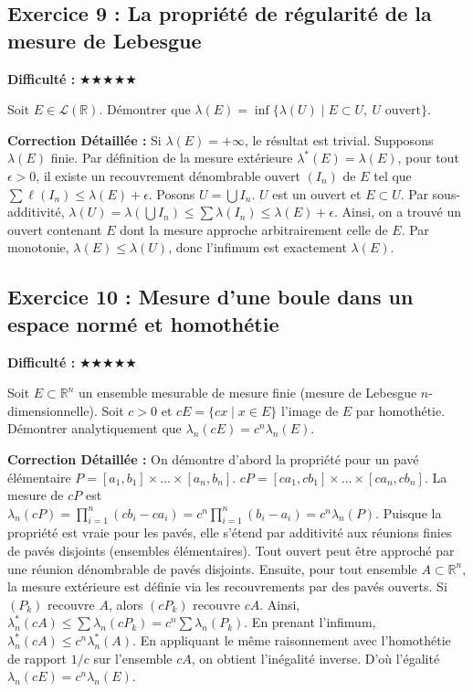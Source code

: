 \documentclass[11pt,a4paper]{article}
\begin{document}
\newpage
\subsection*{Exercice 9 : La propriété de régularité de la mesure de Lebesgue}

\textbf{Difficulté :} $\bigstar\bigstar\bigstar\bigstar\bigstar$

Soit $E \in \mathcal{L}(\mathbb{R})$. Démontrer que $\lambda(E) = \inf\{\lambda(U) \mid E \subset U, \ U \text{ ouvert}\}$.

\textbf{Correction Détaillée :}
Si $\lambda(E) = +\infty$, le résultat est trivial. Supposons $\lambda(E)$ finie.
Par définition de la mesure extérieure $\lambda^*(E) = \lambda(E)$, pour tout $\epsilon > 0$, il existe un recouvrement dénombrable ouvert $(I_n)$ de $E$ tel que $\sum \ell(I_n) \le \lambda(E) + \epsilon$.
Posons $U = \bigcup I_n$. $U$ est un ouvert et $E \subset U$.
Par sous-additivité, $\lambda(U) = \lambda(\bigcup I_n) \le \sum \lambda(I_n) \le \lambda(E) + \epsilon$.
Ainsi, on a trouvé un ouvert contenant $E$ dont la mesure approche arbitrairement celle de $E$.
Par monotonie, $\lambda(E) \le \lambda(U)$, donc l'infimum est exactement $\lambda(E)$.

\newpage
\subsection*{Exercice 10 : Mesure d'une boule dans un espace normé et homothétie}

\textbf{Difficulté :} $\bigstar\bigstar\bigstar\bigstar\bigstar$

Soit $E \subset \mathbb{R}^n$ un ensemble mesurable de mesure finie (mesure de Lebesgue $n$-dimensionnelle). Soit $c > 0$ et $cE = \{cx \mid x \in E\}$ l'image de $E$ par homothétie. Démontrer analytiquement que $\lambda_n(cE) = c^n \lambda_n(E)$.

\textbf{Correction Détaillée :}
On démontre d'abord la propriété pour un pavé élémentaire $P = [a_1, b_1] \times \dots \times [a_n, b_n]$.
$cP = [ca_1, cb_1] \times \dots \times [ca_n, cb_n]$.
La mesure de $cP$ est $\lambda_n(cP) = \prod_{i=1}^n (cb_i - ca_i) = c^n \prod_{i=1}^n (b_i - a_i) = c^n \lambda_n(P)$.
Puisque la propriété est vraie pour les pavés, elle s'étend par additivité aux réunions finies de pavés disjoints (ensembles élémentaires).
Tout ouvert peut être approché par une réunion dénombrable de pavés disjoints.
Ensuite, pour tout ensemble $A \subset \mathbb{R}^n$, la mesure extérieure est définie via les recouvrements par des pavés ouverts.
Si $(P_k)$ recouvre $A$, alors $(cP_k)$ recouvre $cA$.
Ainsi, $\lambda_n^*(cA) \le \sum \lambda_n(cP_k) = c^n \sum \lambda_n(P_k)$. En prenant l'infimum, $\lambda_n^*(cA) \le c^n \lambda_n^*(A)$.
En appliquant le même raisonnement avec l'homothétie de rapport $1/c$ sur l'ensemble $cA$, on obtient l'inégalité inverse.
D'où l'égalité $\lambda_n(cE) = c^n \lambda_n(E)$.
\end{document}
